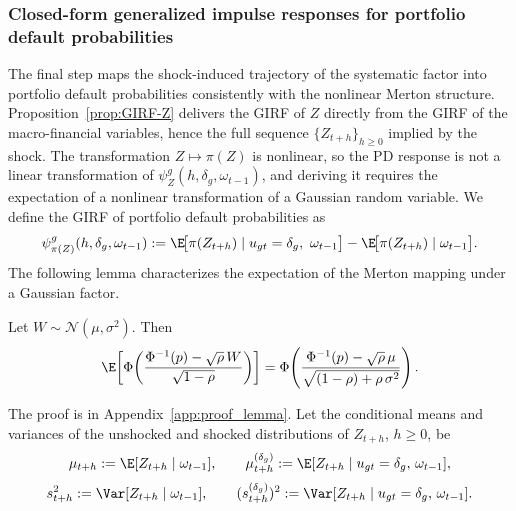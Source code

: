 \subsubsection{Closed-form generalized impulse responses for portfolio default probabilities}
The final step maps the shock-induced trajectory of the systematic factor into
portfolio default probabilities consistently with the nonlinear Merton structure.
Proposition~\ref{prop:GIRF-Z} delivers the GIRF of $Z$ directly from the GIRF of
the macro-financial variables, hence the full sequence $\{Z_{t+h}\}_{h\ge 0}$
implied by the shock. The transformation $Z \mapsto \pi(Z)$ is nonlinear, so the
PD response is not a linear transformation of $\psi^g_Z(h,\delta_g,\omega_{t-1})$,
and deriving it requires the expectation of a nonlinear transformation of a
Gaussian random variable. We define the GIRF of portfolio default probabilities
as
\begin{equation}
    \psi^g_{\pi(Z)}(h,\delta_g,\omega_{t-1})
    := \E\!\big[\pi(Z_{t+h}) \mid u_{gt}=\delta_g,\ \omega_{t-1}\big]
     - \E\!\big[\pi(Z_{t+h}) \mid \omega_{t-1}\big].
    \label{eq:GIRF_PD_Def}
\end{equation}
The following lemma characterizes the expectation of the Merton mapping under a
Gaussian factor.
\begin{lem}\label{lem:closed}
    Let $W \sim \mathcal N(\mu,\sigma^2)$. Then
    \begin{equation}
        \E\!\left[
            \Phi\!\left(
                \frac{\Phi^{-1}(p)-\sqrt{\rho}\,W}{\sqrt{1-\rho}}
            \right)
        \right]
        =
        \Phi\!\left(
            \frac{\Phi^{-1}(p)-\sqrt{\rho}\,\mu}{\sqrt{(1-\rho)+\rho\,\sigma^2}}
        \right).
        \label{eq:closed}
    \end{equation}
\end{lem}
The proof is in Appendix~\ref{app:proof_lemma}. Let the conditional means and
variances of the unshocked and shocked distributions of $Z_{t+h}$, $h \ge 0$, be
\begin{equation}
    \mu_{t+h} := \E[Z_{t+h} \mid \omega_{t-1}],
    \qquad
    \mu^{(\delta_g)}_{t+h} := \E[Z_{t+h} \mid u_{gt}=\delta_g,\, \omega_{t-1}],
\end{equation}
\begin{equation}
    s_{t+h}^2 := \Var[Z_{t+h} \mid \omega_{t-1}],
    \qquad
    (s^{(\delta_g)}_{t+h})^2 := \Var[Z_{t+h} \mid u_{gt}=\delta_g,\, \omega_{t-1}].
\end{equation}
